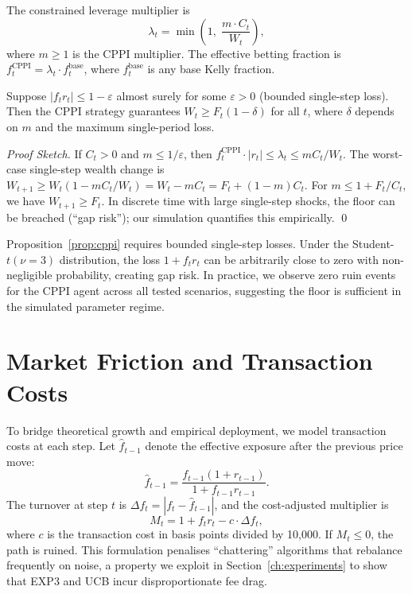 The constrained leverage multiplier is
\[
    \lambda_t = \min\!\left(1,\; \frac{m \cdot C_t}{W_t}\right),
\]
where $m \geq 1$ is the CPPI multiplier. The effective betting fraction is
$f_t^{\text{CPPI}} = \lambda_t \cdot f_t^{\text{base}}$, where
$f_t^{\text{base}}$ is any base Kelly fraction.

\begin{proposition}
\label{prop:cppi}
    Suppose $|f_t r_t| \leq 1 - \varepsilon$ almost surely for some
    $\varepsilon > 0$ (bounded single-step loss). Then the CPPI strategy
    guarantees $W_t \geq F_t(1 - \delta)$ for all $t$, where $\delta$
    depends on $m$ and the maximum single-period loss.
\end{proposition}

\begin{proof}[Proof Sketch]
    If $C_t > 0$ and $m \leq 1/\varepsilon$, then
    $f_t^{\text{CPPI}} \cdot |r_t| \leq \lambda_t \leq m C_t / W_t$.
    The worst-case single-step wealth change is
    $W_{t+1} \geq W_t(1 - m C_t/W_t) = W_t - m C_t = F_t + (1-m)C_t$.
    For $m \leq 1 + F_t/C_t$, we have $W_{t+1} \geq F_t$.
    In discrete time with large single-step shocks, the floor can be
    breached (``gap risk''); our simulation quantifies this empirically.
    \qed
\end{proof}

\begin{remark}
    Proposition~\ref{prop:cppi} requires bounded single-step losses. Under
    the Student-$t(\nu=3)$ distribution, the loss $1 + f_t r_t$ can be
    arbitrarily close to zero with non-negligible probability, creating
    gap risk. In practice, we observe zero ruin events for the CPPI agent
    across all tested scenarios, suggesting the floor is sufficient in
    the simulated parameter regime.
\end{remark}

\section{Market Friction and Transaction Costs}

To bridge theoretical growth and empirical deployment, we model
transaction costs at each step. Let $\hat{f}_{t-1}$ denote the effective
exposure after the previous price move:
\[
    \hat{f}_{t-1} = \frac{f_{t-1}(1 + r_{t-1})}{1 + f_{t-1} r_{t-1}}.
\]
The turnover at step $t$ is $\Delta f_t = |f_t - \hat{f}_{t-1}|$, and the
cost-adjusted multiplier is
\begin{equation}
\label{eq:friction}
    M_t = 1 + f_t r_t - c \cdot \Delta f_t,
\end{equation}
where $c$ is the transaction cost in basis points divided by 10{,}000. If
$M_t \leq 0$, the path is ruined. This formulation penalises ``chattering''
algorithms that rebalance frequently on noise, a property we exploit in
Section~\ref{ch:experiments} to show that EXP3 and UCB incur
disproportionate fee drag.

